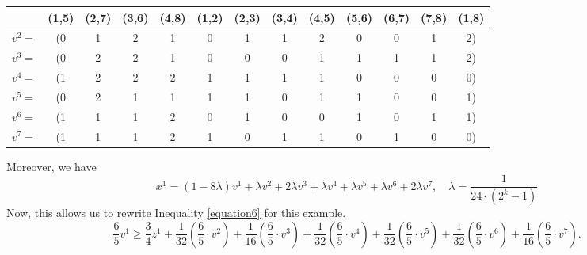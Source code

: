\begin{example}
\begin{table}[h]
	\centering
	\begin{tabular}{ccccccccccccc}
		\toprule
		& (1,5) & (2,7)& (3,6)&(4,8)&(1,2)&(2,3)&(3,4)&(4,5)&(5,6)&(6,7)&(7,8)&(1,8)      \\ \midrule
			$v^2=$ & (0&1&2&1&0&1&1&2&0&0&1&2)  \\
			$v^3=$ & (0&2&2&1&0&0&0&1&1&1&1&2)\\
			$v^4=$ & (1&2&2&2&1&1&1&1&0&0&0&0)\\
			$v^5=$ & (0&2&1&1&1&1&0&1&1&0&0&1)\\
			$v^6=$ & (1&1&1&2&0&1&0&0&1&0&1&1)\\
			$v^7=$ & (1&1&1&2&1&0&1&1&0&1&0&0)\\
				 \bottomrule
	\end{tabular}
\end{table}
Moreover, we have 
\begin{equation*}
x^1 = (1-8\lambda)v^1+ \lambda v^2 + 2\lambda v^3+\lambda v^4+ \lambda v^5+ \lambda v^6 + 2\lambda v^7, \quad \lambda = \frac{1}{24\cdot (2^k-1)}
\end{equation*}
Now, this allows us to rewrite Inequality \ref{equation6} for this example.
\begin{equation*} 
\frac{6}{5}v^1 \geq \frac{3}{4} z^1 +\frac{1}{32}(\frac{6}{5}\cdot v^2) +\frac{1}{16}(\frac{6}{5}\cdot v^3) + \frac{1}{32}(\frac{6}{5}\cdot v^4)+\frac{1}{32}(\frac{6}{5}\cdot v^5) + \frac{1}{32}(\frac{6}{5}\cdot v^6)+ \frac{1}{16}(\frac{6}{5}\cdot v^7).  
\end{equation*}
\end{example}

